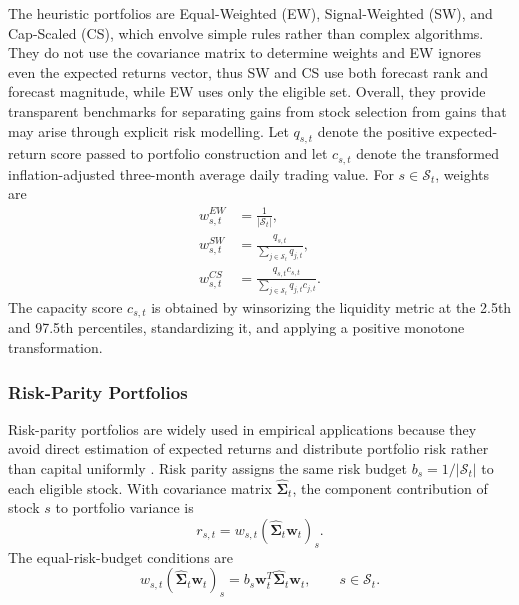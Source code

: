 \documentclass[preprint,12pt,authoryear]{elsarticle}
\begin{document}
\begin{appendices}
The heuristic portfolios are Equal-Weighted (EW), Signal-Weighted (SW), and Cap-Scaled (CS), which envolve simple rules rather than complex algorithms. They do not use the covariance matrix to determine weights \citep{ghayurheaneyplatt2019} and EW ignores even the expected returns vector, thus SW and CS use both forecast rank and forecast magnitude, while EW uses only the eligible set. Overall, they provide transparent benchmarks for separating gains from stock selection from gains that may arise through explicit risk modelling. Let $q_{s,t}$ denote the positive expected-return score passed to portfolio construction and let $c_{s,t}$ denote the transformed inflation-adjusted three-month average daily trading value. For $s\in\mathcal{S}_{t}$, weights are
\begin{align}
w_{s,t}^{EW} &= \frac{1}{|\mathcal{S}_{t}|},\\
w_{s,t}^{SW} &= \frac{q_{s,t}}{\sum_{j\in\mathcal{S}_{t}}q_{j,t}},\\
w_{s,t}^{CS} &= \frac{q_{s,t}c_{s,t}}
{\sum_{j\in\mathcal{S}_{t}}q_{j,t}c_{j,t}}.
\end{align}
The capacity score $c_{s,t}$ is obtained by winsorizing the liquidity metric at the 2.5th and 97.5th percentiles, standardizing it, and applying a positive monotone transformation.

\subsubsection{Risk-Parity Portfolios}

Risk-parity portfolios are widely used in empirical applications because they avoid direct estimation of expected returns and distribute portfolio risk rather than capital uniformly \citep{chavesetal2011}. Risk parity assigns the same risk budget $b_s=1/|\mathcal{S}_{t}|$ to each eligible stock. With covariance matrix $\widehat{\boldsymbol{\Sigma}}_{t}$, the component contribution of stock $s$ to portfolio variance is
\begin{equation}
r_{s,t}=w_{s,t}
\left(\widehat{\boldsymbol{\Sigma}}_{t}\mathbf{w}_{t}\right)_{s}.
\end{equation}
The equal-risk-budget conditions are
\begin{equation}
w_{s,t}\left(\widehat{\boldsymbol{\Sigma}}_{t}\mathbf{w}_{t}\right)_{s}
=b_s\mathbf{w}_{t}^{T}\widehat{\boldsymbol{\Sigma}}_{t}\mathbf{w}_{t},
\qquad s\in\mathcal{S}_{t}.
\end{equation}


\end{appendices}
\end{document}
